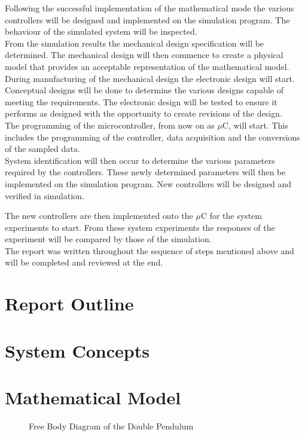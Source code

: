 \documentclass[a4paper,12pt]{article}
\begin{document}
 	Following the successful implementation of the mathematical mode the various controllers will be designed and implemented on the simulation program. The behaviour of the simulated system will be inspected.\\
 	
 	From the simulation results the mechanical design specification will be determined. The mechanical design will then commence to create a physical model that provides an acceptable representation of the mathematical model.\\
 	
 	During manufacturing of the mechanical design the electronic design will start. Conceptual designs will be done to determine the various designs capable of meeting the requirements. The electronic design will be tested to ensure it performs as designed with the opportunity to create revisions of the design.\\
 	
 	The programming of the microcontroller, from now on as $\mu$C, will start. This includes the programming of the controller, data acquisition and the conversions of the sampled data.\\
 	
 	System identification will then occur to determine the various parameters required by the controllers. These newly determined parameters will then be implemented on the simulation program. New controllers will be designed and verified in simulation.
 	
 	The new controllers are then implemented onto the $\mu$C for the system experiments to start. From these system experiments the responses of the experiment will be compared by those of the simulation.\\
 	
 	The report was written throughout the sequence of steps mentioned above and will be completed and reviewed at the end.  	
 	\section{Report Outline}
 	
 	
 	\section{System Concepts}
 	
	\section{Mathematical Model}
	\begin{figure}[h]
		\centering
		
		\caption{Free Body Diagram of the Double Pendulum}
		\label{fig:doublePen}
	\end{figure}
\end{document}
